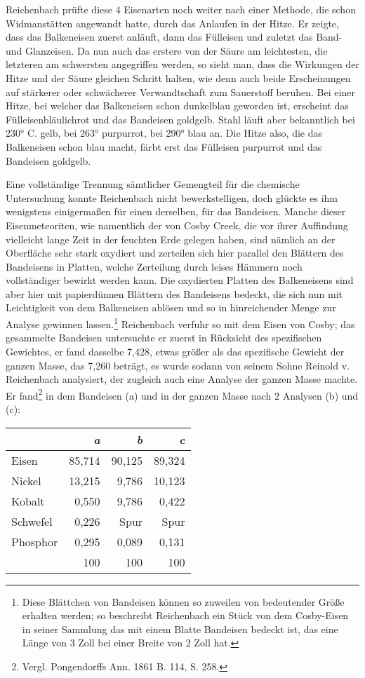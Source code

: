 \documentclass[a4paper, 11pt, oneside]{article}
\begin{document}
Reichenbach prüfte diese 4 Eisenarten noch weiter nach einer Methode, die schon Widmanstätten angewandt hatte, durch das Anlaufen in der Hitze. Er zeigte, dass das Balkeneisen zuerst anläuft, dann das Fülleisen und zuletzt das Band- und Glanzeisen. Da nun auch das erstere von der Säure am leichtesten, die letzteren am schwersten angegriffen werden, so sieht man, dass die Wirkungen der Hitze und der Säure gleichen Schritt halten, wie denn auch beide Erscheinungen auf stärkerer oder schwächerer Verwandtschaft zum Sauerstoff beruhen. Bei einer Hitze, bei welcher das Balkeneisen schon dunkelblau geworden ist, erscheint das Fülleisenbläulichrot und das Bandeisen goldgelb. Stahl läuft aber bekanntlich bei 230° C. gelb, bei 263° purpurrot, bei 290° blau an. Die Hitze also, die das Balkeneisen schon blau macht, färbt erst das Fülleisen purpurrot und das Bandeisen goldgelb.

Eine vollständige Trennung sämtlicher Gemengteil für die chemische Untersuchung konnte Reichenbach nicht bewerkstelligen, doch glückte es ihm wenigstens einigermaßen für einen derselben, für das Bandeisen. Manche dieser Eisenmeteoriten, wie namentlich der von Cosby Creek, die vor ihrer Auffindung vielleicht lange Zeit in der feuchten Erde gelegen haben, sind nämlich an der Oberfläche sehr stark oxydiert und zerteilen sich hier parallel den Blättern des Bandeisens in Platten, welche Zerteilung durch leises Hämmern noch vollständiger bewirkt werden kann. Die oxydierten Platten des Balkeneisens sind aber hier mit papierdünnen Blättern des Bandeisens bedeckt, die sich nun mit Leichtigkeit von dem Balkeneisen ablösen und so in hinreichender Menge zur Analyse gewinnen lassen.\footnote{Diese Blättchen von Bandeisen können so zuweilen von bedeutender Größe erhalten werden; so beschreibt Reichenbach ein Stück von dem Cosby-Eisen in seiner Sammlung das mit einem Blatte Bandeisen bedeckt ist, das eine Länge von 3 Zoll bei einer Breite von 2 Zoll hat.} Reichenbach verfuhr so mit dem Eisen von Cosby; das gesammelte Bandeisen untersuchte er zuerst in Rücksicht des spezifischen Gewichtes, er fand dasselbe 7,428, etwas größer als das spezifische Gewicht der ganzen Masse, das 7,260 beträgt, es wurde sodann von seinem Sohne Reinold v. Reichenbach analysiert, der zugleich auch eine Analyse der ganzen Masse machte. Er fand\footnote{Vergl. Pongendorffs Ann. 1861 B. 114, S. 258.} in dem Bandeisen (a) und in der ganzen Masse nach 2 Analysen (b) und (c):
\begin{center}
\begin{tabular}{ |l|r|r|r| }
    \hline
     & \emph{a} & \emph{b} & \emph{c}\\
    \hline\hline
    Eisen & 85,714 & 90,125 & 89,324\\\hline
    Nickel & 13,215 & 9,786 & 10,123\\\hline
    Kobalt & 0,550 & 9,786 & 0,422\\\hline
    Schwefel & 0,226 & Spur & Spur\\\hline
    Phosphor & 0,295 & 0,089 & 0,131\\\hline
     & 100 & 100 & 100\\
    \hline
\end{tabular}
\end{center}
\end{document}
